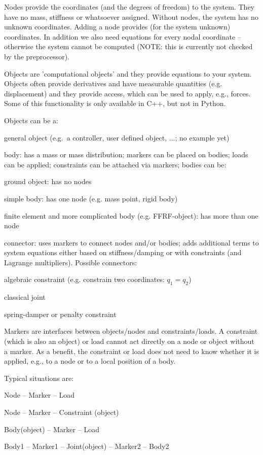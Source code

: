 Nodes provide the coordinates (and the degrees of freedom) to the system. They have no mass, stiffness or whatsoever assigned.
Without nodes, the system has no unknown coordinates.
Adding a node provides (for the system unknown) coordinates. In addition we also need equations for every nodal coordinate -- otherwise the system cannot be computed (NOTE: this is currently not checked by the preprocessor).

Objects are 'computational objects' and they provide equations to your system. Objects often provide derivatives and have measurable quantities (e.g. displacement) and they provide access, which can be used to apply, e.g., forces. Some of this functionality is only available in C++, but not in Python.

Objects can be a:
\bi
  \item general object (e.g.\ a controller, user defined object, ...; no example yet)
  \item body: has a mass or mass distribution; markers can be placed on bodies; loads can be applied; constraints can be attached via markers; bodies can be:
  \bi
    \item[--] ground object: has no nodes
    \item[--] simple body: has one node (e.g. mass point, rigid body)
    \item[--] finite element and more complicated body (e.g. FFRF-object): has more than one node
  \ei
  \item connector: uses markers to connect nodes and/or bodies; adds additional terms to system equations either based on stiffness/damping or with constraints (and Lagrange multipliers). Possible connectors:
  \bi
    \item[--] algebraic constraint (e.g. constrain two coordinates: $q_1 = q_2$)
    \item[--] classical joint
    \item[--] spring-damper or penalty constraint
  \ei
\ei

Markers are interfaces between objects/nodes and constraints/loads.
A constraint (which is also an object) or load cannot act directly on a node or object without a marker.
As a benefit, the constraint or load does not need to know whether it is applied, e.g., to a node or to a local position of a body.

Typical situations are:
\bi
  \item Node -- Marker -- Load
  \item Node -- Marker -- Constraint (object)
  \item Body(object) -- Marker -- Load
  \item Body1 -- Marker1 -- Joint(object) -- Marker2 -- Body2
\ei

